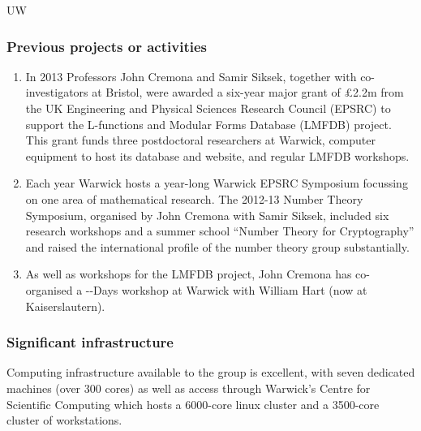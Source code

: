 \begin{sitedescription}{UW}
\subsubsection*{Previous projects or activities}

\begin{enumerate}
\item
In 2013 Professors John Cremona and Samir Siksek, together with
co-investigators at Bristol, were awarded a six-year major grant of
\pounds 2.2m from the UK Engineering and Physical Sciences Research Council
(EPSRC) to support the L-functions and Modular Forms Database (LMFDB)
project.  This grant funds three postdoctoral researchers at Warwick,
computer equipment to host its database and website, and regular LMFDB
workshops.
\item
Each year Warwick hosts a year-long Warwick EPSRC Symposium focussing
on one area of mathematical research.  The 2012-13 Number Theory
Symposium, organised by John Cremona with Samir Siksek, included six
research workshops and a summer school ``Number Theory for
Cryptography'' and raised the international profile of the number
theory group substantially.
\item
As well as workshops for the LMFDB project, John Cremona has
co-organised a -\Sage-Days workshop at Warwick with William Hart
(now at Kaiserslautern).
\end{enumerate}

\subsubsection*{Significant infrastructure}

Computing infrastructure available to the group is excellent, with
seven dedicated machines (over 300 cores) as well as access through
Warwick's Centre for Scientific Computing which hosts a 6000-core
linux cluster and a 3500-core cluster of workstations.
\end{sitedescription}

\begin{draft}
\end{draft}






